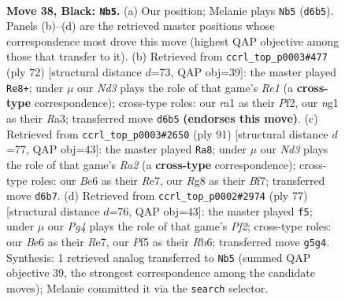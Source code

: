 \documentclass[11pt]{article}
\begin{document}
\clearpage

\begin{figure}[p]\centering
\begin{subfigure}{0.46\textwidth}\centering
\resizebox{\linewidth}{!}{%
\newchessgame
\chessboard[
  setfen={6r1/r7/p1Bnbk2/p4ppp/8/PP3PP1/1K1B3P/R4RN1 b - - 4 38},
  showmover=false,
  pgfstyle=straightmove, color=movearrow, markmove={d6-b5}
]}
\caption{}
\end{subfigure}\hfill
\begin{subfigure}{0.46\textwidth}\centering
\resizebox{\linewidth}{!}{%
\newchessgame
\chessboard[
  setfen={2k5/1pb5/p1r2r2/P2p1ppp/1B6/R1P3PP/5PK1/4R3 w - - 0 37},
  showmover=false,
  pgfstyle=straightmove, color=movearrow, markmove={e1-e8}
]}
\caption{}
\end{subfigure}
\\[4pt]
\begin{subfigure}{0.46\textwidth}\centering
\resizebox{\linewidth}{!}{%
\newchessgame
\chessboard[
  setfen={8/rp2rbk1/2pn1pp1/3p4/PR1P2P1/2NBPP2/5K2/1R6 b - - 11 46},
  showmover=false,
  pgfstyle=straightmove, color=movearrow, markmove={a7-a8}
]}
\caption{}
\end{subfigure}\hfill
\begin{subfigure}{0.46\textwidth}\centering
\resizebox{\linewidth}{!}{%
\newchessgame
\chessboard[
  setfen={8/4rpk1/1r1p2p1/1pnB4/p2RPP1p/P6P/1P1R2P1/6K1 b - - 2 39},
  showmover=false,
  pgfstyle=straightmove, color=movearrow, markmove={f7-f5}
]}
\caption{}
\end{subfigure}
\caption{\textbf{Move 38, Black: \texttt{Nb5}.} (a) Our position; Melanie plays \texttt{Nb5} (\texttt{d6b5}). Panels (b)--(d) are the retrieved master positions whose correspondence most drove this move (highest QAP objective among those that transfer to it). (b) Retrieved from \texttt{ccrl\_top\_p0003\#477} (ply 72) [structural distance $d$=73, QAP obj=39]: the master played \texttt{Re8+}; under $\mu$ our \emph{Nd3} plays the role of that game's \emph{Re1} (a \textbf{cross-type} correspondence); cross-type roles: our \emph{r}a1 as their \emph{P}f2, our \emph{n}g1 as their \emph{R}a3; transferred move \texttt{d6b5} \textbf{(endorses this move)}. (c) Retrieved from \texttt{ccrl\_top\_p0003\#2650} (ply 91) [structural distance $d$=77, QAP obj=43]: the master played \texttt{Ra8}; under $\mu$ our \emph{Nd3} plays the role of that game's \emph{Ra2} (a \textbf{cross-type} correspondence); cross-type roles: our \emph{B}e6 as their \emph{R}e7, our \emph{R}g8 as their \emph{B}f7; transferred move \texttt{d6b7}. (d) Retrieved from \texttt{ccrl\_top\_p0002\#2974} (ply 77) [structural distance $d$=76, QAP obj=43]: the master played \texttt{f5}; under $\mu$ our \emph{Pg4} plays the role of that game's \emph{Pf2}; cross-type roles: our \emph{B}e6 as their \emph{R}e7, our \emph{P}f5 as their \emph{R}b6; transferred move \texttt{g5g4}. Synthesis: 1 retrieved analog transferred to \texttt{Nb5} (summed QAP objective 39, the strongest correspondence among the candidate moves); Melanie committed it via the \texttt{search} selector.}
\label{fig:thought-m75}
\end{figure}
\end{document}
